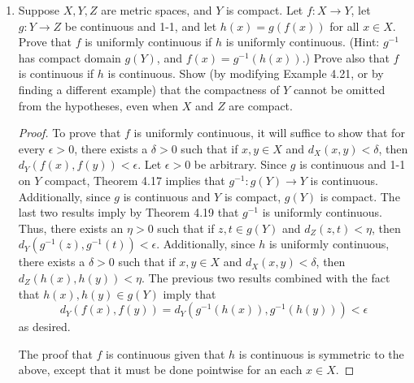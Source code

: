 \documentclass[../psets.tex]{subfiles}
\begin{document}
\begin{enumerate}[label={\textbf{\arabic*.}}]
\begin{enumerate}
\begin{proof}
            $C_1$ and $C_2$ are both closed since every point in each is isolated.\par
            $C_1+C_2$ is countable since we can define a natural injection from it to $C_1\times C_2$ and we know that cross products of countable sets are countable. $C_1+C_2$ is dense in $\R^1$ since the set of all fractional parts of all $n\alpha\in C_2$ is dense in $[0,1]$ because $\alpha$ is irrational (and thus there is no repeating cycle), and we can shift this dense segment using values in $C_1$. Thus, since $C_1+C_2$ is a countable dense subset of $\R^1$, $\overline{C_1+C_2}=\R^1$ is uncountable, i.e., contains more elements than $C_1+C_2$, showing that $C_1+C_2$ is not closed.
        \end{proof}
    \end{enumerate}
    \item Suppose $X,Y,Z$ are metric spaces, and $Y$ is compact. Let $f:X\to Y$, let $g:Y\to Z$ be continuous and 1-1, and let $h(x)=g(f(x))$ for all $x\in X$. Prove that $f$ is uniformly continuous if $h$ is uniformly continuous. (Hint: $g^{-1}$ has compact domain $g(Y)$, and $f(x)=g^{-1}(h(x))$.) Prove also that $f$ is continuous if $h$ is continuous. Show (by modifying Example 4.21, or by finding a different example) that the compactness of $Y$ cannot be omitted from the hypotheses, even when $X$ and $Z$ are compact.
    \begin{proof}
        To prove that $f$ is uniformly continuous, it will suffice to show that for every $\epsilon>0$, there exists a $\delta>0$ such that if $x,y\in X$ and $d_X(x,y)<\delta$, then $d_Y(f(x),f(y))<\epsilon$. Let $\epsilon>0$ be arbitrary. Since $g$ is continuous and 1-1 on $Y$ compact, Theorem 4.17 implies that $g^{-1}:g(Y)\to Y$ is continuous. Additionally, since $g$ is continuous and $Y$ is compact, $g(Y)$ is compact. The last two results imply by Theorem 4.19 that $g^{-1}$ is uniformly continuous. Thus, there exists an $\eta>0$ such that if $z,t\in g(Y)$ and $d_Z(z,t)<\eta$, then $d_Y(g^{-1}(z),g^{-1}(t))<\epsilon$. Additionally, since $h$ is uniformly continuous, there exists a $\delta>0$ such that if $x,y\in X$ and $d_X(x,y)<\delta$, then $d_Z(h(x),h(y))<\eta$. The previous two results combined with the fact that $h(x),h(y)\in g(Y)$ imply that
        \begin{equation*}
            d_Y(f(x),f(y)) = d_Y(g^{-1}(h(x)),g^{-1}(h(y))) < \epsilon
        \end{equation*}
        as desired.\par
        The proof that $f$ is continuous given that $h$ is continuous is symmetric to the above, except that it must be done pointwise for an each $x\in X$.\par

\end{proof}
\end{enumerate}
\end{document}
